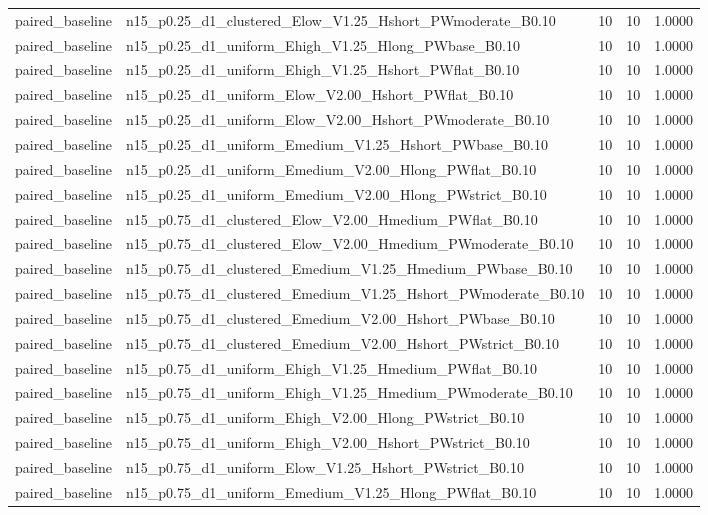 \begin{tabular}{llrrr}
paired_baseline & n15_p0.25_d1_clustered_Elow_V1.25_Hshort_PWmoderate_B0.10 & 10 & 10 & 1.0000 \\
paired_baseline & n15_p0.25_d1_uniform_Ehigh_V1.25_Hlong_PWbase_B0.10 & 10 & 10 & 1.0000 \\
paired_baseline & n15_p0.25_d1_uniform_Ehigh_V1.25_Hshort_PWflat_B0.10 & 10 & 10 & 1.0000 \\
paired_baseline & n15_p0.25_d1_uniform_Elow_V2.00_Hshort_PWflat_B0.10 & 10 & 10 & 1.0000 \\
paired_baseline & n15_p0.25_d1_uniform_Elow_V2.00_Hshort_PWmoderate_B0.10 & 10 & 10 & 1.0000 \\
paired_baseline & n15_p0.25_d1_uniform_Emedium_V1.25_Hshort_PWbase_B0.10 & 10 & 10 & 1.0000 \\
paired_baseline & n15_p0.25_d1_uniform_Emedium_V2.00_Hlong_PWflat_B0.10 & 10 & 10 & 1.0000 \\
paired_baseline & n15_p0.25_d1_uniform_Emedium_V2.00_Hlong_PWstrict_B0.10 & 10 & 10 & 1.0000 \\
paired_baseline & n15_p0.75_d1_clustered_Elow_V2.00_Hmedium_PWflat_B0.10 & 10 & 10 & 1.0000 \\
paired_baseline & n15_p0.75_d1_clustered_Elow_V2.00_Hmedium_PWmoderate_B0.10 & 10 & 10 & 1.0000 \\
paired_baseline & n15_p0.75_d1_clustered_Emedium_V1.25_Hmedium_PWbase_B0.10 & 10 & 10 & 1.0000 \\
paired_baseline & n15_p0.75_d1_clustered_Emedium_V1.25_Hshort_PWmoderate_B0.10 & 10 & 10 & 1.0000 \\
paired_baseline & n15_p0.75_d1_clustered_Emedium_V2.00_Hshort_PWbase_B0.10 & 10 & 10 & 1.0000 \\
paired_baseline & n15_p0.75_d1_clustered_Emedium_V2.00_Hshort_PWstrict_B0.10 & 10 & 10 & 1.0000 \\
paired_baseline & n15_p0.75_d1_uniform_Ehigh_V1.25_Hmedium_PWflat_B0.10 & 10 & 10 & 1.0000 \\
paired_baseline & n15_p0.75_d1_uniform_Ehigh_V1.25_Hmedium_PWmoderate_B0.10 & 10 & 10 & 1.0000 \\
paired_baseline & n15_p0.75_d1_uniform_Ehigh_V2.00_Hlong_PWstrict_B0.10 & 10 & 10 & 1.0000 \\
paired_baseline & n15_p0.75_d1_uniform_Ehigh_V2.00_Hshort_PWstrict_B0.10 & 10 & 10 & 1.0000 \\
paired_baseline & n15_p0.75_d1_uniform_Elow_V1.25_Hshort_PWstrict_B0.10 & 10 & 10 & 1.0000 \\
paired_baseline & n15_p0.75_d1_uniform_Emedium_V1.25_Hlong_PWflat_B0.10 & 10 & 10 & 1.0000 \\

\end{tabular}
